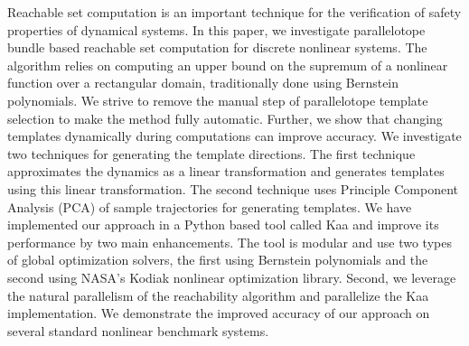 Reachable set computation is an important technique for the verification of safety properties of dynamical systems.
%
%
In this paper, we investigate parallelotope bundle based reachable set computation for discrete nonlinear systems.
%
The algorithm relies on computing an upper bound on the supremum of a nonlinear function over a rectangular domain,
traditionally done using Bernstein polynomials.
 We strive to remove the manual step of parallelotope template selection to make the method fully automatic.
%
Further, we show that changing templates dynamically during computations can improve accuracy.
%
%
%
We investigate two techniques for generating the template directions.
%
The first technique approximates the dynamics as a linear transformation and generates templates using this linear transformation.
%
The second technique uses Principle Component Analysis (PCA) of sample trajectories for generating templates.
%
We have implemented our approach in a Python based tool called Kaa and improve its performance by two main enhancements.
%
%
The tool is modular and use two types of global optimization solvers, the first using Bernstein polynomials and the second using NASA's Kodiak nonlinear optimization library.
%
Second, we leverage the natural parallelism of the reachability algorithm and parallelize the Kaa implementation.
%
We demonstrate the improved accuracy of our approach on several standard nonlinear benchmark systems.
%
%
